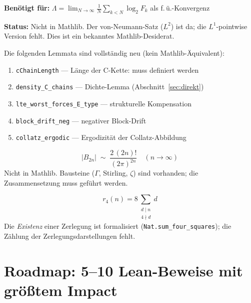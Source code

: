 \documentclass[12pt,a4paper]{article}
\begin{document}
\begin{tcolorbox}[lücke, title={Fehlt: Birkhoff-Punktgrenzwertsatz}]
\textbf{Benötigt für:} $\Lambda = \lim_{N\to\infty}\frac{1}{N}\sum_{k<N}\log_2 F_k$
als f.\,ü.-Konvergenz

\textbf{Status:} Nicht in Mathlib. Der von-Neumann-Satz ($L^2$) ist da;
die $L^1$-pointwise Version fehlt. Dies ist ein bekanntes Mathlib-Desiderat.
\end{tcolorbox}

\begin{tcolorbox}[lücke, title={Fehlt: Collatz-spezifische Strukturlemmata}]
Die folgenden Lemmata sind vollständig neu (kein Mathlib-Äquivalent):

\begin{enumerate}[nosep, label=(\arabic*)]
  \item \texttt{cChainLength} --- Länge der C-Kette: muss definiert werden
  \item \texttt{density\_C\_chains} --- Dichte-Lemma (Abschnitt~\ref{sec:direkt})
  \item \texttt{lte\_worst\_forces\_E\_type} --- strukturelle Kompensation
  \item \texttt{block\_drift\_neg} --- negativer Block-Drift
  \item \texttt{collatz\_ergodic} --- Ergodizität der Collatz-Abbildung
\end{enumerate}
\end{tcolorbox}

\begin{tcolorbox}[lücke, title={Fehlt: Asymptotik der Bernoulli-Zahlen}]
\[
  |B_{2n}| \;\sim\; \frac{2\,(2n)!}{(2\pi)^{2n}}
  \quad (n\to\infty)
\]
Nicht in Mathlib. Bausteine ($\Gamma$, Stirling, $\zeta$) sind vorhanden;
die Zusammensetzung muss geführt werden.
\end{tcolorbox}

\begin{tcolorbox}[lücke, title={Fehlt: Jacobi-Vierquadratsatz (Zählformel $r_4$)}]
\[
  r_4(n) = 8\sum_{\substack{d\mid n\\ 4\nmid d}} d
\]
Die \emph{Existenz} einer Zerlegung ist formalisiert (\texttt{Nat.sum\_four\_squares});
die Zählung der Zerlegungsdarstellungen fehlt.
\end{tcolorbox}

\section{Roadmap: 5--10 Lean-Beweise mit größtem Impact}
\label{sec:roadmap}
\end{document}
